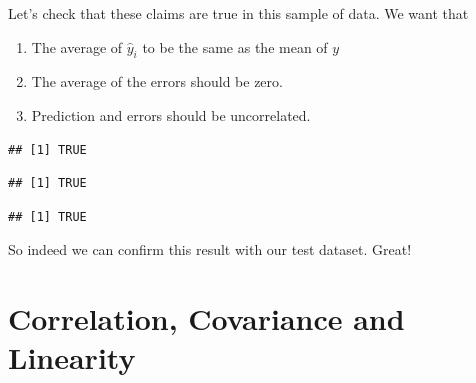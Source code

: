 \documentclass[]{book}
\newenvironment{Shaded}{\begin{snugshade}}{\end{snugshade}}
\newcommand{\KeywordTok}[1]{\textcolor[rgb]{0.13,0.29,0.53}{\textbf{#1}}}
\newcommand{\DecValTok}[1]{\textcolor[rgb]{0.00,0.00,0.81}{#1}}
\newcommand{\CommentTok}[1]{\textcolor[rgb]{0.56,0.35,0.01}{\textit{#1}}}
\newcommand{\OperatorTok}[1]{\textcolor[rgb]{0.81,0.36,0.00}{\textbf{#1}}}
\newcommand{\NormalTok}[1]{#1}
\providecommand{\tightlist}{%
  \setlength{\itemsep}{0pt}\setlength{\parskip}{0pt}}
\begin{document}
Let's check that these claims are true in this sample of data. We want
that

\begin{enumerate}
\def\labelenumi{\arabic{enumi}.}
\tightlist
\item
  The average of \(\hat{y}_i\) to be the same as the mean of \(y\)
\item
  The average of the errors should be zero.
\item
  Prediction and errors should be uncorrelated.
\end{enumerate}

\begin{Shaded}
\end{Shaded}

\begin{verbatim}
## [1] TRUE
\end{verbatim}

\begin{Shaded}
\end{Shaded}

\begin{verbatim}
## [1] TRUE
\end{verbatim}

\begin{Shaded}
\end{Shaded}

\begin{verbatim}
## [1] TRUE
\end{verbatim}

So indeed we can confirm this result with our test dataset. Great!

\section{Correlation, Covariance and
Linearity}\label{correlation-covariance-and-linearity}
\end{document}
